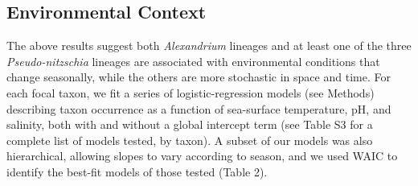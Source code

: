 \documentclass[
]{article}
\begin{document}
\hypertarget{environmental-context}{%
\subsection{Environmental Context}\label{environmental-context}}

The above results suggest both \emph{Alexandrium} lineages and at least
one of the three \emph{Pseudo-nitzschia} lineages are associated with
environmental conditions that change seasonally, while the others are
more stochastic in space and time. For each focal taxon, we fit a series
of logistic-regression models (see Methods) describing taxon occurrence
as a function of sea-surface temperature, pH, and salinity, both with
and without a global intercept term (see Table S3 for a complete list of
models tested, by taxon). A subset of our models was also hierarchical,
allowing slopes to vary according to season, and we used WAIC to
identify the best-fit models of those tested (Table 2).

\small
\end{document}
